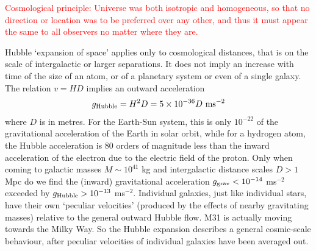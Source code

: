 \documentclass[12pt,a4paper]{article}
\begin{document}
\textcolor{red}{Cosmological principle: Universe was both isotropic and homogeneous, so that no direction or location was to be preferred over any other, and thus it must appear the same to all observers no matter where they are.}

Hubble `expansion of space' applies only to cosmological distances, that is on the scale of intergalactic or larger separations. It does not imply an increase with time of the size of an atom, or of a planetary system or even of a single galaxy. The relation $v = HD$ implies an outward acceleration
\begin{equation*}
g_{\rm Hubble} = H^2 D = 5\times 10^{-36} D ~{\rm m s^{-2}}
\end{equation*}
where $D$ is in metres. For the Earth-Sun system, this is only $10^{-22}$ of the gravitational acceleration of the Earth in solar orbit, while for a hydrogen atom, the Hubble acceleration is $80$ orders of magnitude less than the inward acceleration of the electron due to the electric field of the proton. Only when coming to galactic masses $M \sim  10^{41}$ kg and intergalactic distance scales $D > 1$ Mpc do we find the (inward) gravitational acceleration $g_{\rm grav} < 10^{-14}$ ms$^{-2}$ exceeded by $g_{\rm Hubble} > 10^{-13}$ ms$^{-2}$. Individual galaxies, just like individual stars, have their own `peculiar velocities' (produced by the effects of nearby gravitating masses) relative to the general outward Hubble flow. M31 is actually moving towards the Milky Way. So the Hubble expansion describes a general cosmic-scale behaviour, after peculiar velocities of individual galaxies have been averaged out.
\end{document}
